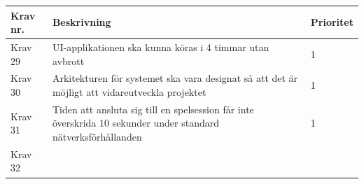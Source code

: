 \documentclass[10pt]{article}
\begin{document}
		\begin{tabular}{|p{2cm}|p{8cm}|p{2cm}|}
		\hline
		\textbf{Krav nr.} & \textbf{Beskrivning} & \textbf{Prioritet} \\ \hline
		Krav 29 & UI-applikationen ska kunna köras i 4 timmar utan avbrott & 1 \\ \hline
		Krav 30 & Arkitekturen för systemet ska vara designat så att det är möjligt att vidareutveckla projektet & 1 \\ \hline
		Krav 31 & Tiden att ansluta sig till en spelsession får inte överskrida 10 sekunder under standard nätverksförhållanden & 1 \\ \hline
		Krav 32 & & \\ \hline
		
	\end{tabular}
	
\pagebreak

\printbibliography
{}
\end{document}
